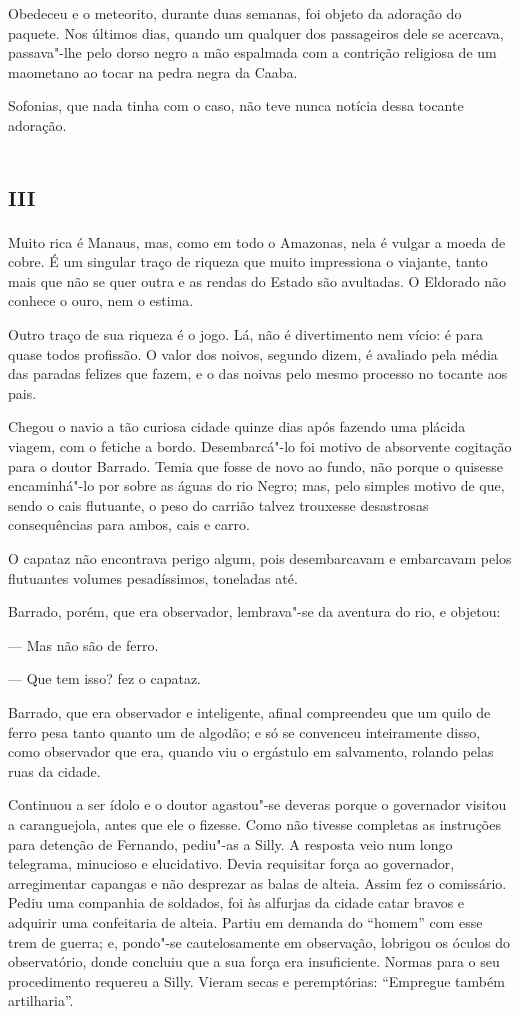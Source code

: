 Obedeceu e o meteorito, durante duas semanas, foi objeto da adoração do
paquete. Nos últimos dias, quando um qualquer dos passageiros dele se
acercava, passava"-lhe pelo dorso negro a mão espalmada com a contrição
religiosa de um maometano ao tocar na pedra negra da Caaba.

Sofonias, que nada tinha com o caso, não teve nunca notícia dessa
tocante adoração.

\section{\textsc{iii}}

Muito rica é Manaus, mas, como em todo o Amazonas, nela é vulgar a moeda
de cobre. É um singular traço de riqueza que muito impressiona o
viajante, tanto mais que não se quer outra e as rendas do Estado são
avultadas. O Eldorado não conhece o ouro, nem o estima.

Outro traço de sua riqueza é o jogo. Lá, não é divertimento nem vício: é
para quase todos profissão. O valor dos noivos, segundo dizem, é
avaliado pela média das paradas felizes que fazem, e o das noivas pelo
mesmo processo no tocante aos pais.

Chegou o navio a tão curiosa cidade quinze dias após fazendo uma plácida
viagem, com o fetiche a bordo. Desembarcá"-lo foi motivo de absorvente
cogitação para o doutor Barrado. Temia que fosse de novo ao fundo, não
porque o quisesse encaminhá"-lo por sobre as águas do rio Negro; mas,
pelo simples motivo de que, sendo o cais flutuante, o peso do carrião
talvez trouxesse desastrosas consequências para ambos, cais e carro.

O capataz não encontrava perigo algum, pois desembarcavam e embarcavam
pelos flutuantes volumes pesadíssimos, toneladas até.

Barrado, porém, que era observador, lembrava"-se da aventura do rio, e
objetou:

--- Mas não são de ferro.

--- Que tem isso? fez o capataz.

Barrado, que era observador e inteligente, afinal compreendeu que um
quilo de ferro pesa tanto quanto um de algodão; e só se convenceu
inteiramente disso, como observador que era, quando viu o ergástulo em
salvamento, rolando pelas ruas da cidade.

Continuou a ser ídolo e o doutor agastou"-se deveras porque o governador
visitou a caranguejola, antes que ele o fizesse. Como não tivesse
completas as instruções para detenção de Fernando, pediu"-as a Silly. A
resposta veio num longo telegrama, minucioso e elucidativo. Devia
requisitar força ao governador, arregimentar capangas e não desprezar as
balas de alteia. Assim fez o comissário. Pediu uma companhia de
soldados, foi às alfurjas da cidade catar bravos e adquirir uma
confeitaria de alteia. Partiu em demanda do ``homem'' com esse trem de
guerra; e, pondo"-se cautelosamente em observação, lobrigou os óculos do
observatório, donde concluiu que a sua força era insuficiente. Normas
para o seu procedimento requereu a Silly. Vieram secas e peremptórias:
``Empregue também artilharia''.

